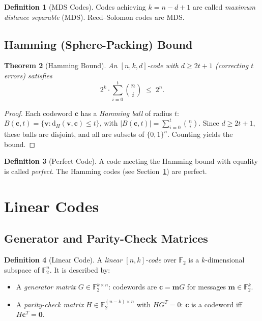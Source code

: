 \documentclass[12pt,a4paper]{amsart}
\newtheorem{theorem}{Theorem}[section]
\theoremstyle{definition}
\newtheorem{definition}[theorem]{Definition}
\theoremstyle{remark}
\newcommand{\dist}{\mathrm{d}}
\begin{document}
\begin{definition}[MDS Codes]
Codes achieving $k = n - d + 1$ are called \emph{maximum distance separable}
(MDS). Reed--Solomon codes are MDS.
\end{definition}

\subsection{Hamming (Sphere-Packing) Bound}

\begin{theorem}[Hamming Bound]\label{thm:hamming-bound}
An $[n,k,d]$-code with $d \geq 2t+1$ (correcting $t$ errors) satisfies
\[
  2^k \cdot \sum_{i=0}^{t}\binom{n}{i} \;\leq\; 2^n.
\]
\end{theorem}
\begin{proof}
Each codeword $\mathbf{c}$ has a \emph{Hamming ball} of radius $t$:
$B(\mathbf{c}, t) = \{\mathbf{v} : \dist_H(\mathbf{v},\mathbf{c}) \leq t\}$,
with $|B(\mathbf{c},t)| = \sum_{i=0}^t \binom{n}{i}$. Since $d \geq 2t+1$, these
balls are disjoint, and all are subsets of $\{0,1\}^n$. Counting yields the bound.
\end{proof}

\begin{definition}[Perfect Code]
A code meeting the Hamming bound with equality is called \emph{perfect}.
The Hamming codes (see Section~\ref{sec:linear}) are perfect.
\end{definition}

\section{Linear Codes}\label{sec:linear}

\subsection{Generator and Parity-Check Matrices}

\begin{definition}[Linear Code]
A \emph{linear $[n,k]$-code} over $\mathbb{F}_2$ is a $k$-dimensional subspace
of $\mathbb{F}_2^n$. It is described by:
\begin{itemize}
  \item A \emph{generator matrix} $G \in \mathbb{F}_2^{k \times n}$: codewords
        are $\mathbf{c} = \mathbf{m} G$ for messages $\mathbf{m} \in \mathbb{F}_2^k$.
  \item A \emph{parity-check matrix} $H \in \mathbb{F}_2^{(n-k) \times n}$ with
        $H G^T = 0$: $\mathbf{c}$ is a codeword iff $H \mathbf{c}^T = \mathbf{0}$.
\end{itemize}
\end{definition}
\end{document}
